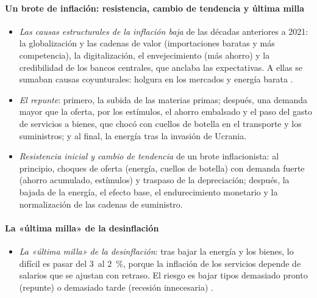 \documentclass[11pt]{article}
\begin{document}
\paragraph{Un brote de inflación: resistencia, cambio de tendencia y última milla}
\begin{itemize}
\item \emph{Las causas estructurales de la inflación baja} de las décadas anteriores a 2021: la globalización y las cadenas de valor (importaciones baratas y más competencia), la digitalización, el envejecimiento (más ahorro) y la credibilidad de los bancos centrales, que anclaba las expectativas. A ellas se sumaban causas coyunturales: holgura en los mercados y energía barata \parencite{BPI2022Inflacion}.
\item \emph{El repunte}: primero, la subida de las materias primas; después, una demanda mayor que la oferta, por los estímulos, el ahorro embalsado y el paso del gasto de servicios a bienes, que chocó con cuellos de botella en el transporte y los suministros; y al final, la energía tras la invasión de Ucrania.
\item \emph{Resistencia inicial y cambio de tendencia} de un brote inflacionista: al principio, choques de oferta (energía, cuellos de botella) con demanda fuerte (ahorro acumulado, estímulos) y traspaso de la depreciación; después, la bajada de la energía, el efecto base, el endurecimiento monetario y la normalización de las cadenas de suministro.
\end{itemize}

\paragraph{La «última milla» de la desinflación}
\begin{itemize}
\item \emph{La «última milla» de la desinflación}: tras bajar la energía y los bienes, lo difícil es pasar del 3~al 2~\%, porque la inflación de los servicios depende de salarios que se ajustan con retraso. El riesgo es bajar tipos demasiado pronto (repunte) o demasiado tarde (recesión innecesaria) \parencite{BPI2024Informe}.
\end{itemize}
\end{document}
